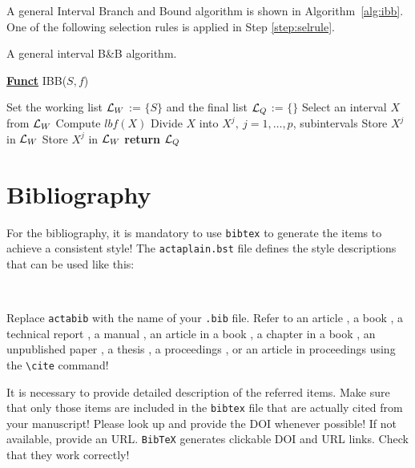 \documentclass[notnumberedtheorems,withtitlethanks]{actacyb}
\begin{document}
A general Interval Branch and Bound algorithm is shown in Algorithm~\ref{alg:ibb}. One of the following selection rules is applied in Step \ref{step:selrule}.

\begin{algorithm}[ht!]
\caption{ A general interval B\&B algorithm.} 
\label{alg:ibb} 
\textbf{\underline{Funct}} IBB($S,f$)
\renewcommand{\algorithmiccomment}[1]{\hfill {\it #1}}
\begin{algorithmic}[1]
\STATE Set the working list ${\cal L}_W$ := $\{S\}$ and the final list ${\cal L}_Q$ := $\{\}$     
 \label{alg:igoend}
  \STATE  Select an interval $X$ from ${\cal L}_W$ \label{step:selrule}  
  \STATE Compute $lbf(X)$ 		  
    \STATE Divide $X$ into $X^j,\ j=1,\dots, p$, subintervals   
        \STATE Store $X^j$ in ${\cal L}_W$ 
      \ELSE
        \STATE Store $X^j$ in ${\cal L}_W$ 
      \ENDIF
    \ENDFOR  
  \ENDIF
\ENDWHILE
\STATE \textbf{return} ${\cal L}_Q$
\end{algorithmic}
\end{algorithm}


\section{Bibliography}
For the bibliography, it is mandatory to use \verb|bibtex| to generate the items to achieve a consistent style!
The \verb|actaplain.bst| file defines the style descriptions that can be used like this:

\begin{verbatim}


\end{verbatim}

Replace {\tt actabib} with the name of your {\tt .bib} file.
Refer to an article \cite{ratz99nonsmooth}, a book \cite{Klatte1993a}, a technical report \cite{ratz96optimized}, a manual \cite{T3D},
an article in a book \cite{Fuchi1996a}, a chapter in a book \cite{CORR96}, an unpublished paper \cite{jamartin}, a thesis \cite{braune-diss}, a proceedings \cite{griewank-proceedings}, or an article in proceedings \cite{alefeld-survey} using the \verb|\cite| command!

It is necessary to provide detailed description of the referred items.
Make sure that only those items are included in the \verb|bibtex| file that are actually cited from your manuscript!
Please look up and provide the DOI whenever possible! If not available, provide an URL.
\verb|BibTeX| generates clickable DOI and URL links. Check that they work correctly!

{


}
\end{document}
